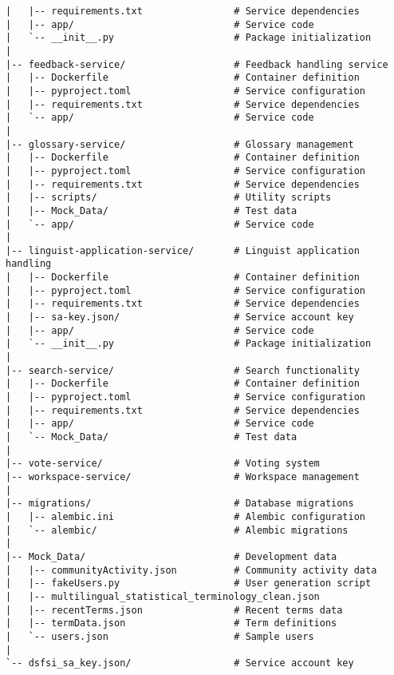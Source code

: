 \documentclass[12pt]{article}
\begin{document}
\begin{lstlisting}[frame=single, numbers=none, basicstyle=\ttfamily\footnotesize, columns=flexible]
|   |-- requirements.txt                # Service dependencies
|   |-- app/                            # Service code
|   `-- __init__.py                     # Package initialization
|
|-- feedback-service/                   # Feedback handling service
|   |-- Dockerfile                      # Container definition
|   |-- pyproject.toml                  # Service configuration
|   |-- requirements.txt                # Service dependencies
|   `-- app/                            # Service code
|
|-- glossary-service/                   # Glossary management
|   |-- Dockerfile                      # Container definition
|   |-- pyproject.toml                  # Service configuration
|   |-- requirements.txt                # Service dependencies
|   |-- scripts/                        # Utility scripts
|   |-- Mock_Data/                      # Test data
|   `-- app/                            # Service code
|
|-- linguist-application-service/       # Linguist application handling
|   |-- Dockerfile                      # Container definition
|   |-- pyproject.toml                  # Service configuration
|   |-- requirements.txt                # Service dependencies
|   |-- sa-key.json/                    # Service account key
|   |-- app/                            # Service code
|   `-- __init__.py                     # Package initialization
|
|-- search-service/                     # Search functionality
|   |-- Dockerfile                      # Container definition
|   |-- pyproject.toml                  # Service configuration
|   |-- requirements.txt                # Service dependencies
|   |-- app/                            # Service code
|   `-- Mock_Data/                      # Test data
|
|-- vote-service/                       # Voting system
|-- workspace-service/                  # Workspace management
|
|-- migrations/                         # Database migrations
|   |-- alembic.ini                     # Alembic configuration
|   `-- alembic/                        # Alembic migrations
|
|-- Mock_Data/                          # Development data
|   |-- communityActivity.json          # Community activity data
|   |-- fakeUsers.py                    # User generation script
|   |-- multilingual_statistical_terminology_clean.json
|   |-- recentTerms.json                # Recent terms data
|   |-- termData.json                   # Term definitions
|   `-- users.json                      # Sample users
|
`-- dsfsi_sa_key.json/                  # Service account key
\end{lstlisting}
\end{document}

